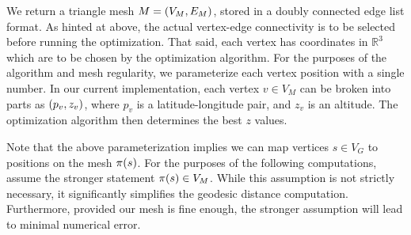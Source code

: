 We return a triangle mesh \(M = \pof{V_M, E_M}\), stored in a doubly connected edge list format. As hinted at above, the actual vertex-edge connectivity is to be selected before running the optimization. That said, each vertex has coordinates in \(\mathbb{R}^3\) which are to be chosen by the optimization algorithm. For the purposes of the algorithm and mesh regularity, we parameterize each vertex position with a single number. In our current implementation, each vertex \(v \in V_M\) can be broken into parts as \(\pof{p_v, z_v}\), where \(p_v\) is a latitude-longitude pair, and \(z_v\) is an altitude. The optimization algorithm then determines the best \(z\) values.

Note that the above parameterization implies we can map vertices \(s \in V_G\) to positions on the mesh \(\pi\pof{s}\). For the purposes of the following computations, assume the stronger statement \(\pi\pof{s} \in V_M\). While this assumption is not strictly necessary, it significantly simplifies the geodesic distance computation. Furthermore, provided our mesh is fine enough, the stronger assumption will lead to minimal numerical error.
